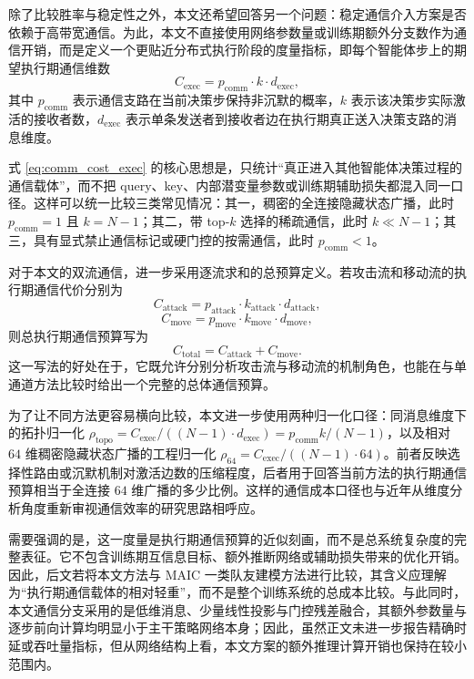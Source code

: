 除了比较胜率与稳定性之外，本文还希望回答另一个问题：稳定通信介入方案是否依赖于高带宽通信。为此，本文不直接使用网络参数量或训练期额外分支数作为通信开销，而是定义一个更贴近分布式执行阶段的度量指标，即每个智能体步上的期望执行期通信维数
\begin{equation}
C_{\mathrm{exec}} = p_{\mathrm{comm}} \cdot k \cdot d_{\mathrm{exec}},
\label{eq:comm_cost_exec}
\end{equation}
其中 $p_{\mathrm{comm}}$ 表示通信支路在当前决策步保持非沉默的概率，$k$ 表示该决策步实际激活的接收者数，$d_{\mathrm{exec}}$ 表示单条发送者到接收者边在执行期真正送入决策支路的消息维度。

式 \eqref{eq:comm_cost_exec} 的核心思想是，只统计“真正进入其他智能体决策过程的通信载体”，而不把 query、key、内部潜变量参数或训练期辅助损失都混入同一口径。这样可以统一比较三类常见情况：其一，稠密的全连接隐藏状态广播，此时 $p_{\mathrm{comm}}=1$ 且 $k=N-1$；其二，带 top-$k$ 选择的稀疏通信，此时 $k \ll N-1$；其三，具有显式禁止通信标记或硬门控的按需通信，此时 $p_{\mathrm{comm}}<1$。

对于本文的双流通信，进一步采用逐流求和的总预算定义。若攻击流和移动流的执行期通信代价分别为
\begin{equation}
C_{\mathrm{attack}} = p_{\mathrm{attack}}\cdot k_{\mathrm{attack}}\cdot d_{\mathrm{attack}},
\end{equation}
\begin{equation}
C_{\mathrm{move}} = p_{\mathrm{move}}\cdot k_{\mathrm{move}}\cdot d_{\mathrm{move}},
\end{equation}
则总执行期通信预算写为
\begin{equation}
C_{\mathrm{total}} = C_{\mathrm{attack}} + C_{\mathrm{move}}.
\label{eq:comm_cost_total}
\end{equation}
这一写法的好处在于，它既允许分别分析攻击流与移动流的机制角色，也能在与单通道方法比较时给出一个完整的总体通信预算。

为了让不同方法更容易横向比较，本文进一步使用两种归一化口径：同消息维度下的拓扑归一化 \(\rho_{\mathrm{topo}}=C_{\mathrm{exec}}/((N-1)\cdot d_{\mathrm{exec}})=p_{\mathrm{comm}}k/(N-1)\)，以及相对 $64$ 维稠密隐藏状态广播的工程归一化 \(\rho_{64}=C_{\mathrm{exec}}/((N-1)\cdot 64)\)。前者反映选择性路由或沉默机制对激活边数的压缩程度，后者用于回答当前方法的执行期通信预算相当于全连接 $64$ 维广播的多少比例。这样的通信成本口径也与近年从维度分析角度重新审视通信效率的研究思路相呼应\cite{sun2025drmac}。

需要强调的是，这一度量是执行期通信预算的近似刻画，而不是总系统复杂度的完整表征。它不包含训练期互信息目标、额外推断网络或辅助损失带来的优化开销。因此，后文若将本文方法与 MAIC 一类队友建模方法进行比较，其含义应理解为“执行期通信载体的相对轻重”，而不是整个训练系统的总成本比较。与此同时，本文通信分支采用的是低维消息、少量线性投影与门控残差融合，其额外参数量与逐步前向计算均明显小于主干策略网络本身；因此，虽然正文未进一步报告精确时延或吞吐量指标，但从网络结构上看，本文方案的额外推理计算开销也保持在较小范围内。

